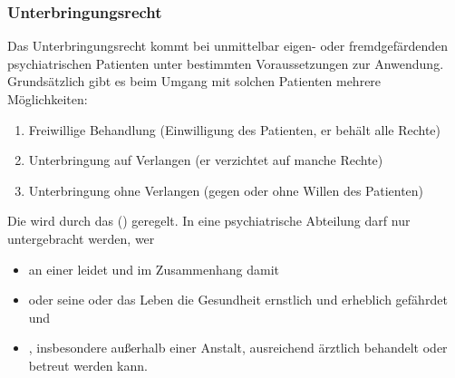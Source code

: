 \subsubsection{Unterbringungsrecht}

\Text
{{\TxBeschreibung}}%
{%
Das Unterbringungsrecht kommt bei unmittelbar eigen- oder
fremdgefärdenden psychiatrischen Patienten unter
bestimmten Voraussetzungen zur Anwendung.
Grundsätzlich gibt es beim Umgang mit solchen Patienten
mehrere Möglichkeiten:

\begin{enumerate}
  \item Freiwillige Behandlung (Einwilligung des Patienten,
  er behält alle Rechte)
  \item Unterbringung auf Verlangen (er
  verzichtet auf manche Rechte)
  \item Unterbringung ohne Verlangen (gegen oder ohne Willen
  des Patienten)
\end{enumerate}


Die  wird durch das
 () geregelt.
In eine psychiatrische Abteilung darf nur untergebracht
werden, wer
\begin{itemize}
  \item an einer  leidet und im
  Zusammenhang damit
\item {} oder seine  oder das Leben
   die Gesundheit  ernstlich und erheblich
  gefährdet und
  \item {}, insbesondere außerhalb einer
  Anstalt, ausreichend ärztlich behandelt oder betreut
  werden kann.
\end{itemize}


}%





